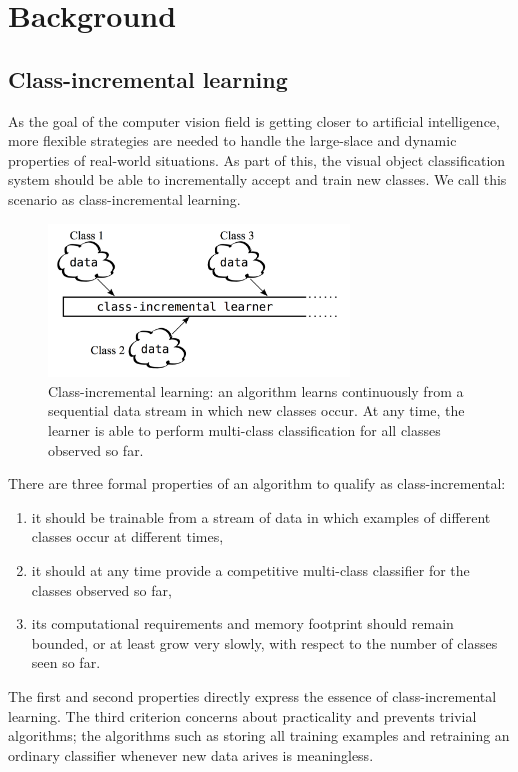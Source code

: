 
\section{Background}
\label{sec:background}

\subsection{Class-incremental learning}
\label{sec:cil}

As the goal of the computer vision field is getting closer to artificial intelligence, more flexible strategies are needed to handle the large-slace and dynamic properties of real-world situations. As part of this, the visual object classification system should be able to incrementally accept and train new classes. We call this scenario as class-incremental learning.

\begin{figure}[h]
\includegraphics[width=80mm]{data/class-incremental_learning.png}
\centering
\caption{Class-incremental learning: an algorithm learns continuously from a sequential data stream in which new classes occur. At any time, the learner is able to perform multi-class classification for all classes observed so far. \label{fig:class-incremental_learning}}
\end{figure}

There are three formal properties of an algorithm to qualify as class-incremental:
\begin{enumerate}
\item it should be trainable from a stream of data in which examples of different classes occur at different times,
\item it should at any time provide a competitive multi-class classifier for the classes observed so far,
\item its computational requirements and memory footprint should remain bounded, or at least grow very slowly, with respect to the number of classes seen so far.
\end{enumerate}
The first and second properties directly express the essence of class-incremental learning. The third criterion concerns about practicality and prevents trivial algorithms; the algorithms such as storing all training examples and retraining an ordinary classifier whenever new data arives is meaningless.


